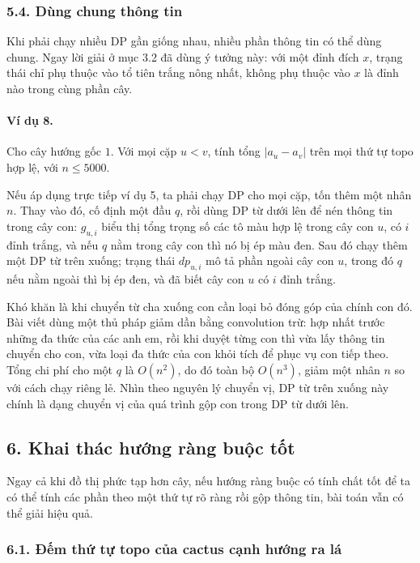 \documentclass[11pt]{article}
\begin{document}
\subsubsection*{5.4. Dùng chung thông tin}

Khi phải chạy nhiều DP gần giống nhau, nhiều phần thông tin có thể dùng chung.
Ngay lời giải ở mục 3.2 đã dùng ý tưởng này: với một đỉnh đích \(x\), trạng
thái chỉ phụ thuộc vào tổ tiên trắng nông nhất, không phụ thuộc vào \(x\) là
đỉnh nào trong cùng phần cây.

\paragraph{Ví dụ 8.}
Cho cây hướng gốc \(1\). Với mọi cặp \(u<v\), tính tổng \(|a_u-a_v|\) trên mọi
thứ tự topo hợp lệ, với \(n\le 5000\).

Nếu áp dụng trực tiếp ví dụ 5, ta phải chạy DP cho mọi cặp, tốn thêm một nhân
\(n\). Thay vào đó, cố định một đầu \(q\), rồi dùng DP từ dưới lên để nén thông
tin trong cây con: \(g_{u,i}\) biểu thị tổng trọng số các tô màu hợp lệ trong
cây con \(u\), có \(i\) đỉnh trắng, và nếu \(q\) nằm trong cây con thì nó bị ép
màu đen. Sau đó chạy thêm một DP từ trên xuống; trạng thái \(dp_{u,i}\) mô tả
phần ngoài cây con \(u\), trong đó \(q\) nếu nằm ngoài thì bị ép đen, và đã biết
cây con \(u\) có \(i\) đỉnh trắng.

Khó khăn là khi chuyển từ cha xuống con cần loại bỏ đóng góp của chính con đó.
Bài viết dùng một thủ pháp giảm dần bằng convolution trừ: hợp nhất trước những
đa thức của các anh em, rồi khi duyệt từng con thì vừa lấy thông tin chuyển cho
con, vừa loại đa thức của con khỏi tích để phục vụ con tiếp theo. Tổng chi phí
cho một \(q\) là \(O(n^2)\), do đó toàn bộ \(O(n^3)\), giảm một nhân \(n\) so
với cách chạy riêng lẻ. Nhìn theo nguyên lý chuyển vị, DP từ trên xuống này
chính là dạng chuyển vị của quá trình gộp con trong DP từ dưới lên.

\subsection*{6. Khai thác hướng ràng buộc tốt}

Ngay cả khi đồ thị phức tạp hơn cây, nếu hướng ràng buộc có tính chất tốt để ta
có thể tính các phần theo một thứ tự rõ ràng rồi gộp thông tin, bài toán vẫn có
thể giải hiệu quả.

\subsubsection*{6.1. Đếm thứ tự topo của cactus cạnh hướng ra lá}
\end{document}
